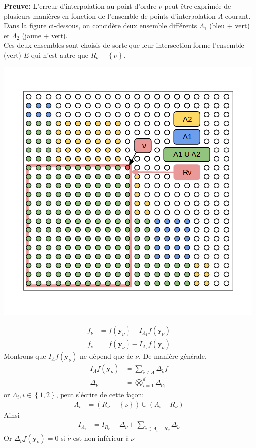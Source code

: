\textbf{Preuve:} L'erreur d'interpolation au point d'ordre $\nu$ peut être exprimée de plusieurs manières en fonction de l'ensemble de points d'interpolation $\Lambda$ courant.
Dans la figure ci-dessous, on concidère deux ensemble différents $\Lambda_1$ (bleu + vert) et $\Lambda_2$ (jaune + vert). \\
Ces deux ensembles sont choisis de sorte que leur intersection forme l'ensemble (vert) $E$ qui n'est autre que $R_{\nu} - \left \{ \nu \right \}$.
\begin{center}
\includegraphics[height= 7 cm,width = 0.5\linewidth]{images/preuve.png}
\end{center}
\begin{align}
		f_{\nu} &= f(\textbf{y}_{\nu}) - I_{\Lambda_1} f(\textbf{y}_{\nu})\\ \nonumber
		f_{\nu} &= f(\textbf{y}_{\nu}) - I_{\Lambda_2} f(\textbf{y}_{\nu}) \nonumber
\end{align}
Montrons que $I_{\Lambda} f(\textbf{y}_{\nu})$ ne dépend que de $\nu$.
De manière générale,
\begin{align}
	  I_{\Lambda} f(\textbf{y}_{\nu}) &= \sum_{\tilde{\nu}\in \Lambda} \Delta_{\tilde{\nu}} f \\ \nonumber
		\Delta_{\tilde{\nu}} &= \bigotimes_{i=1}^d \Delta_{\tilde{\nu}_i} \nonumber
\end{align}
or $\Lambda_i, i \in \left \{ 1,2 \right \}$, peut s'écrire de cette façon:
\begin{align}
		\Lambda_i &= (R_{\nu} - \left \{ \nu \right \}) \cup (\Lambda_i - R_{\nu}) \nonumber
\end{align}
Ainsi
\begin{align}
		I_{\Lambda_i} &= I_{R_{\nu}} - \Delta_{\nu} + \sum_{\tilde{\nu}\in \Lambda_i-R_{\nu}} \Delta_{\tilde{\nu}} \nonumber
\end{align}
Or $\Delta_{\tilde{\nu}} f(\textbf{y}_{\nu}) = 0$ si $\tilde{\nu}$ est non inférieur à $\nu$\\
